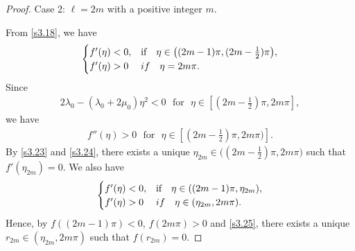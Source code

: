\documentclass[10pt,a4paper]{amsart}
\begin{document}
\begin{proof}
\medskip\noindent
Case 2: $\ell=2m$ with a positive integer $m$.

From \eqref{s3.18}, we have 
\begin{equation}\label{s3.23}
\begin{array}{l}
\begin{cases}
f'(\eta)<0,&\mbox{\rm if}\quad \eta\in\big((2m-1)\pi, (2m-\frac{1}{2})\pi\big),\\
f'(\eta)>0    & {\rm if}\quad \eta=2m\pi.
\end{cases}
\end{array}
\end{equation}
Since
\begin{equation*}
\begin{aligned}
2\lambda_0-(\lambda_0+2\mu_0)\eta^2<0\,\,\,\,\text{for}\,\,\,\,
\eta\in[(2m-\frac{1}{2})\pi,2m\pi],
\end{aligned}
\end{equation*}
we have
\begin{equation}\label{s3.24}
\begin{aligned}
f''(\eta)>0\,\,\,\,\text{for}\,\,\,\,\eta\in[(2m-\frac{1}{2})\pi,2m\pi)].
\end{aligned}
\end{equation}
By \eqref{s3.23} and \eqref{s3.24}, there exists a unique $\eta_{2m}\in \big((2m-\frac{1}{2})\pi,2m\pi\big)$ such that $f'(\eta_{2m})=0$. We also have
\begin{equation}\label{s3.25}
\begin{array}{l}
\begin{cases}
f'(\eta)<0,&\mbox{\rm if}\quad \eta\in((2m-1)\pi, \eta_{2m}),\\
f'(\eta)>0    & {\rm if}\quad \eta\in(\eta_{2m}, 2m\pi).
\end{cases}
\end{array}
\end{equation}
Hence, by $f((2m-1)\pi)< 0$, $f(2m\pi)> 0$ and \eqref{s3.25}, there exists a unique $r_{2m}\in (\eta_{2m},2m\pi)$ such that $f(r_{2m})=0$.

\end{proof}
\end{document}
